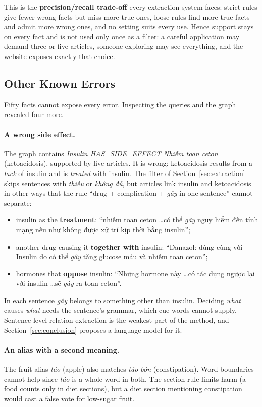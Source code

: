 \documentclass[11pt, a4paper]{article}
\begin{document}
This is the \textbf{precision/recall trade-off} every extraction system faces: strict rules give fewer wrong facts but miss more true ones, loose rules find more true facts and admit more wrong ones, and no setting suits every use. Hence support stays on every fact and is not used only once as a filter: a careful application may demand three or five articles, someone exploring may see everything, and the website exposes exactly that choice.

\subsection{Other Known Errors}

Fifty facts cannot expose every error. Inspecting the queries and the graph revealed four more.

\paragraph{A wrong side effect.} The graph contains \emph{Insulin HAS\_SIDE\_EFFECT Nhiễm toan ceton} (ketoacidosis), supported by five articles. It is wrong: ketoacidosis results from a \emph{lack} of insulin and is \emph{treated} with insulin. The filter of Section~\ref{sec:extraction} skips sentences with \emph{thiếu} or \emph{không đủ}, but articles link insulin and ketoacidosis in other ways that the rule ``drug + complication + \emph{gây} in one sentence'' cannot separate:
\begin{itemize}
    \item insulin as the \textbf{treatment}: ``nhiễm toan ceton \ldots có thể \emph{gây} nguy hiểm đến tính mạng nếu như không được xử trí kịp thời bằng insulin'';
    \item another drug causing it \textbf{together with} insulin: ``Danazol: dùng cùng với Insulin do có thể \emph{gây} tăng glucose máu và nhiễm toan ceton'';
    \item hormones that \textbf{oppose} insulin: ``Những hormone này \ldots có tác dụng ngược lại với insulin \ldots sẽ \emph{gây} ra toan ceton''.
\end{itemize}
In each sentence \emph{gây} belongs to something other than insulin. Deciding \emph{what} causes \emph{what} needs the sentence's grammar, which cue words cannot supply. Sentence-level relation extraction is the weakest part of the method, and Section~\ref{sec:conclusion} proposes a language model for it.

\paragraph{An alias with a second meaning.} The fruit alias \emph{táo} (apple) also matches \emph{táo bón} (constipation). Word boundaries cannot help since \emph{táo} is a whole word in both. The section rule limits harm (a food counts only in diet sections), but a diet section mentioning constipation would cast a false vote for low-sugar fruit.
\end{document}
